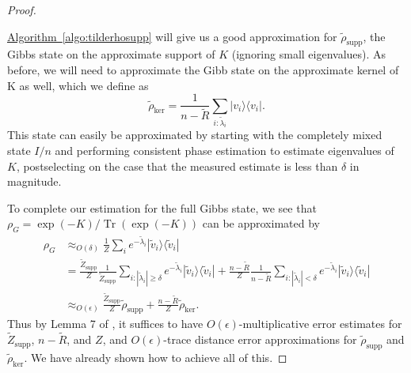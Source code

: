 \documentclass[a4paper,UKenglish,cleveref, autoref]{lipics-v2019}
\theoremstyle{remark}
\numberwithin{equation}{section}
\numberwithin{oracle}{section}
\numberwithin{remark}{section}
\newcommand{\algo}[1]{\hyperref[algo:#1]{Algorithm~\ref*{algo:#1}}}
\newcommand{\ket}[1]{|#1\rangle}
\newcommand{\bra}[1]{\langle#1|}
\DeclareMathOperator{\tr}{Tr}
\begin{document}
\begin{proof}
\begin{algorithm}[htbp]
\begin{enumerate}
\end{enumerate}
\end{algorithm}
\algo{tilderhosupp} will give us a good approximation for $\tilde{\rho}_{\text{supp}}$, the Gibbs state on the approximate support of $K$ (ignoring small eigenvalues). As before, we will need to approximate the Gibb state on the approximate kernel of K as well, which we define as
\begin{equation}
\tilde{\rho}_{\text{ker}} = \frac{1}{n-\widetilde{R}} \sum_{i: \tilde{\lambda}_i} \ket{v_i}\bra{v_i}.
\end{equation}
This state can easily be approximated by starting with the completely mixed state $I/n$ and performing consistent phase estimation to estimate eigenvalues of $K$, postselecting on the case that the measured estimate is less than $\delta$ in magnitude.

To complete our estimation for the full Gibbs state, we see that $\rho_G = \exp(-K)/\tr(\exp(-K))$ can be approximated by
\begin{align}
\rho_G &\approx_{O(\delta)} \frac{1}{Z} \sum_{i} e^{-\tilde{\lambda}_i} \ket{\tilde{v}_i}\bra{\tilde{v}_i} \\
&= \frac{\widetilde{Z}_{\text{supp}}}{Z} \frac{1}{\widetilde{Z}_{\text{supp}}} \sum_{i:|\tilde{\lambda}_i| \ge \delta} e^{-\tilde{\lambda}_i} \ket{\tilde{v}_i}\bra{\tilde{v}_i} + \frac{n-\widetilde{R}}{Z} \frac{1}{n-\widetilde{R}} \sum_{i:|\tilde{\lambda}_i| < \delta} e^{-\tilde{\lambda}_i} \ket{\tilde{v}_i}\bra{\tilde{v}_i}\\
&\approx_{O(\epsilon)} \frac{\widetilde{Z}_{\text{supp}}}{Z} \tilde{\rho}_{\text{supp}} + \frac{n-\widetilde{R}}{Z} \tilde{\rho}_{\text{ker}}.
\end{align}
Thus by Lemma 7 of \cite{vanApeldoorn2017quantum} , it suffices to have $O(\epsilon)$-multiplicative error estimates for $\widetilde{Z}_{\text{supp}}$, $n-\widetilde{R}$, and $Z$, and $O(\epsilon)$-trace distance error approximations for $\tilde{\rho}_{\text{supp}}$ and $\tilde{\rho}_{\text{ker}}$. We have already shown how to achieve all of this.
\end{proof}
\end{document}
